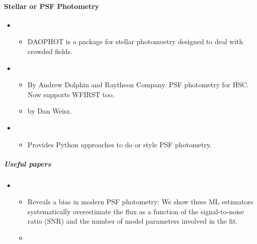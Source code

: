 \documentclass[letterpaper,10pt,english]{sphinxmanual}
\begin{document}
\paragraph{Stellar or PSF Photometry}
\label{\detokenize{resource/astro/topics/photometry:stellar-or-psf-photometry}}\begin{itemize}
\item {} 
\begin{itemize}
\item {} 
DAOPHOT is a package for stellar photomoetry designed to deal with
crowded fields.

\end{itemize}

\item {} 
\begin{itemize}
\item {} 
By Andrew Dolphin and Raytheon Company. PSF photometry for HSC.
Now supports WFIRST too.

\item {} 
 by Dan Weisz.

\end{itemize}

\item {} 
\begin{itemize}
\item {} 
Provides Python approaches to do  or  style PSF
photometry.

\end{itemize}

\end{itemize}


\subparagraph{Useful papers}
\label{\detokenize{resource/astro/topics/photometry:useful-papers}}\begin{itemize}
\item {} 
\begin{itemize}
\item {} 
Reveals a bias in modern PSF photometry: We show these ML
estimators systematically overestimate the flux as a function of
the signal-to-noise ratio (SNR) and the number of model parameters
involved in the fit.

\item {} 

\end{itemize}

\end{itemize}
\end{document}
